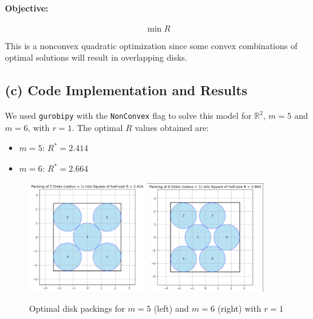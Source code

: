 \documentclass[11pt]{article}
\begin{document}
\paragraph{Objective:}
\[
\min R
\]

This is a nonconvex quadratic optimization since some convex combinations of optimal solutions will result in overlapping disks.

\subsection*{(c) Code Implementation and Results}

We used \texttt{gurobipy} with the \texttt{NonConvex} flag to solve this model for $\mathbb{R}^2$, $m=5$ and $m=6$, with $r=1$. The optimal $R$ values obtained are:

\begin{itemize}
    \item $m=5$: $R^* = 2.414$
    \item $m=6$: $R^* = 2.664$
\end{itemize}

\begin{figure}[h!]
    \centering
    \includegraphics[width=0.45\textwidth]{packing_5.png}
    \includegraphics[width=0.45\textwidth]{packing_6.png}
    \caption{Optimal disk packings for $m=5$ (left) and $m=6$ (right) with $r=1$}
\end{figure}
\end{document}
